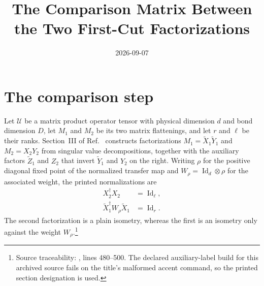 \documentclass{article}
\title{The Comparison Matrix Between the Two First-Cut Factorizations}
\author{}
\date{2026-09-07}
\begin{document}
\maketitle
{}

\section{The comparison step}

Let $\mathcal U$ be a matrix product operator tensor with physical dimension
$d$ and bond dimension $D$, let $M_1$ and $M_2$ be its two matrix flattenings,
and let $r$ and $\ell$ be their ranks. Section~III of
Ref.~\cite{Cirac2017MPU} constructs factorizations
$M_1=\tilde X_1\tilde Y_1$ and $M_2=X_2Y_2$ from singular value
decompositions, together with the auxiliary factors $\tilde Z_1$ and $Z_2$
that invert $\tilde Y_1$ and $Y_2$ on the right. Writing $\rho$ for the
positive diagonal fixed point of the normalized transfer map and
$W_\rho=\operatorname{Id}_d\otimes\rho$ for the associated weight, the printed
normalizations are
\begin{align}
    X_2^\dagger X_2
     & =\operatorname{Id}_\ell,
    \label{eq:fbc25_inverse_compatible_comparison_matrix_second_isometry} \\
    \tilde X_1^\dagger W_\rho\tilde X_1
     & =\operatorname{Id}_r.
    \label{eq:fbc25_inverse_compatible_comparison_matrix_weighted_isometry}
\end{align}
The second factorization is a plain isometry, whereas the first is an isometry
only against the weight $W_\rho$.\footnote{Source traceability:
    , lines 480--500. The declared
    auxiliary-label build for this archived source fails on the title's
    malformed accent command, so the printed section designation is used.}
\end{document}
